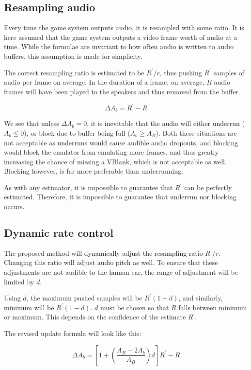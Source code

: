 \documentclass[11pt, a4paper]{article}
\begin{document}
\subsection{Resampling audio}
Every time the game system outputs audio, it is resampled with some ratio.
It is here assumed that the game system outputs a video frame worth of audio at a time.
While the formulae are invariant to how often audio is written to audio buffers, this assumption
is made for simplicity.

The correct resampling ratio is estimated to be $R^{'} / r$,
thus pushing $R^{'}$ samples of audio per frame on average.
In the duration of a frame, on average, $R$ audio frames will have been played to the speakers
and thus removed from the buffer.

\begin{equation}
\Delta A_b = R^{'} - R
\end{equation}

We see that unless $\Delta A_b = 0$, it is inevitable that the audio will either underrun ($A_b \leq 0$),
or block due to buffer being full ($A_b \geq A_B$).
Both these situations are not acceptable as underruns would cause audible audio dropouts,
and blocking would block the emulator from emulating more frames, and thus greatly increasing the chance of missing a VBlank, which is not acceptable as well. Blocking however, is far more preferable than underrunning.

As with any estimator, it is impossible to guarantee that $R^{'}$ can be perfectly estimated.
Therefore, it is impossible to guarantee that underrun nor blocking occurs.

\subsection{Dynamic rate control}
The proposed method will dynamically adjust the resampling ratio $R^{'} / r$.
Changing this ratio will adjust audio pitch as well. To ensure that these adjustments are not audible to the human ear, the range of adjustment will be limited by $d$.

Using $d$, the maximum pushed samples will be $R^{'} \left(1 + d\right)$,
and similarly, minimum will be $R^{'} \left(1 - d\right)$.
$d$ must be chosen so that $R$ falls between minimum or maximum. This depends on the confidence of the estimate $R^{'}$.

The revised update formula will look like this:

\begin{equation} \label{eq:update}
\Delta A_b = \left[ 1 + \left(\frac{A_B - 2A_b}{A_B}\right) d \right] R^{'} - R
\end{equation}
\end{document}
